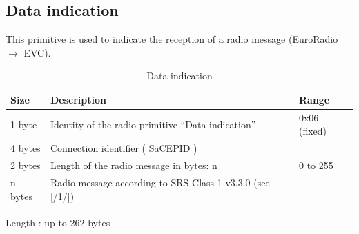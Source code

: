 \documentclass[nocc]{template/openetcs_report}
\begin{document}
\subsection{Data indication}
This primitive is used to indicate the reception of a radio message (EuroRadio $\rightarrow$ EVC).
 			\begin{longtable}{|l|l|l|}
				\caption{Data indication}\\ 
				\hline
				
					\begin{minipage}[t]{0.1\linewidth} \textbf{Size}	\end{minipage}
				&	\begin{minipage}[t]{0.5\linewidth} \textbf{Description}	\end{minipage}
				&	\begin{minipage}[t]{0.3\linewidth} \textbf{Range} \end{minipage} \\
				
				\hline
					 \begin{minipage}[t]{0.1\linewidth}1 byte \end{minipage}
					&\begin{minipage}[t]{0.6\linewidth}Identity of the radio primitive "`Data indication"'	\end{minipage}
					&\begin{minipage}[t]{0.3\linewidth}0x06 (fixed) \end{minipage} \\
					
				\hline
					 \begin{minipage}[t]{0.1\linewidth}4 bytes \end{minipage}
					&\begin{minipage}[t]{0.6\linewidth}Connection identifier ( SaCEPID )	\end{minipage}
					&\begin{minipage}[t]{0.3\linewidth} \end{minipage} \\
					
				\hline
					 \begin{minipage}[t]{0.1\linewidth}2 bytes \end{minipage}
					&\begin{minipage}[t]{0.6\linewidth}Length of the radio message in bytes: n	\end{minipage}
					&\begin{minipage}[t]{0.3\linewidth}0 to 255 \end{minipage} \\
					
				\hline
					 \begin{minipage}[t]{0.1\linewidth}n bytes \end{minipage}
					&\begin{minipage}[t]{0.6\linewidth}Radio message according to SRS Class 1 v3.3.0 (see [/1/])	\end{minipage}
					&\begin{minipage}[t]{0.3\linewidth}\end{minipage} \\
					
				\hline	
			\end{longtable}
			Length : up to 262 bytes
\end{document}
